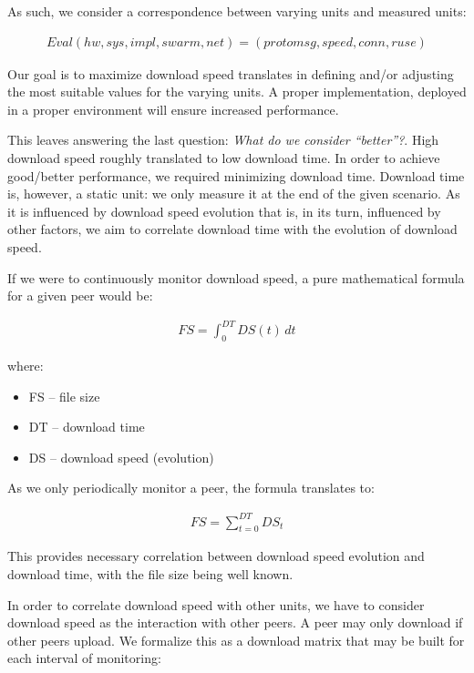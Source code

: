 As such, we consider a correspondence between varying units and measured
units:

\begin{align}
\label{eq:proto-measure:eval}
Eval(hw, sys, impl, swarm, net) = (protomsg, speed, conn, ruse)
\end{align}

Our goal is to maximize download speed translates in defining and/or adjusting
the most suitable values for the varying units. A proper implementation,
deployed in a proper environment will ensure increased performance.

This leaves answering the last question: \textit{What do we consider
``better''?}. High download speed roughly translated to low download time. In
order to achieve good/better performance, we required minimizing download
time. Download time is, however, a static unit: we only measure it at the end
of the given scenario. As it is influenced by download speed evolution that
is, in its turn, influenced by other factors, we aim to correlate download
time with the evolution of download speed.

If we were to continuously monitor download speed, a pure mathematical formula
for a given peer would be:

\begin{align}
  FS = \int_0^{DT} DS(t)\,dt
\end{align}

where:

\begin{itemize}
  \item FS -- file size
  \item DT -- download time
  \item DS -- download speed (evolution)
\end{itemize}

As we only periodically monitor a peer, the formula translates to:

\begin{align}
  FS = \sum_{t=0}^{DT} DS_{t}
\end{align}

This provides necessary correlation between download speed evolution and
download time, with the file size being well known.

In order to correlate download speed with other units, we have to consider
download speed as the interaction with other peers. A peer may only download
if other peers upload. We formalize this as a download matrix that may
be built for each interval of monitoring:

